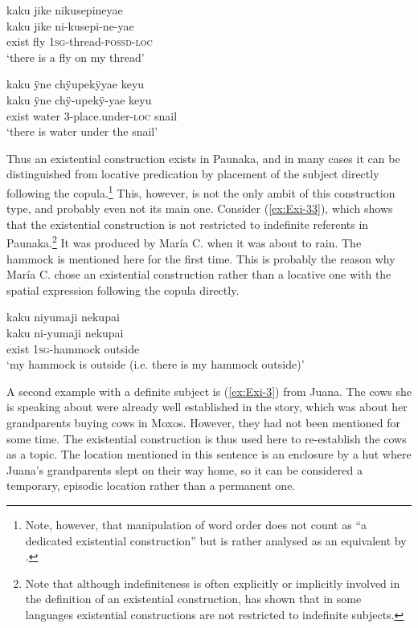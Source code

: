 \ea\label{ex:Exi-1}
\begingl
\glpreamble kaku jike nikusepineyae\\
\gla kaku jike ni-kusepi-ne-yae\\
\glb exist fly 1\textsc{sg}-thread-\textsc{possd}-\textsc{loc}\\
\glft ‘there is a fly on my thread’
\endgl
\trailingcitation{[rxx-e181024l.092]}
\xe

\ea\label{ex:Exi-2}
\begingl
\glpreamble kaku ÿne chÿupekÿyae keyu\\
\gla kaku ÿne chÿ-upekÿ-yae keyu\\
\glb exist water 3-place.under-\textsc{loc} snail\\
\glft ‘there is water under the snail’
\endgl
\trailingcitation{[jcx-e090727s.035]}
\xe


Thus an existential construction exists in Paunaka, and in many cases it can be distinguished from locative predication by placement of the subject directly following the copula.\footnote{Note, however, that manipulation of word order does not count as “a dedicated existential construction” but is rather analysed as an equivalent by \citet[19]{Creissels2014a}.} This, however, is not the only ambit of this construction type, and probably even not its main one. Consider (\ref{ex:Exi-33}), which shows that the existential construction is not restricted to indefinite referents in Paunaka.\footnote{Note that although indefiniteness is often explicitly or implicitly involved in the definition of an existential construction, \citet[4]{Creissels2014a} has shown that in some languages existential constructions are not restricted to indefinite subjects.} It was produced by María C. when it was about to rain. The hammock is mentioned here for the first time. This is probably the reason why María C. chose an existential construction rather than a locative one with the spatial expression following the copula directly.

\ea\label{ex:Exi-33}
\begingl
\glpreamble kaku niyumaji nekupai\\
\gla kaku ni-yumaji nekupai\\
\glb exist 1\textsc{sg}-hammock outside\\
\glft ‘my hammock is outside (i.e. there is my hammock outside)’
\endgl
\trailingcitation{[cux-120410ls.258]}
\xe

A second example with a definite subject is (\ref{ex:Exi-3}) from Juana. The cows she is speaking about were already well established in the story, which was about her grandparents buying cows in Moxos. However, they had not been mentioned for some time. The existential construction is thus used here to re-establish the cows as a topic. The location mentioned in this sentence is an enclosure by a hut where Juana’s grandparents slept on their way home, so it can be considered a temporary, episodic location rather than a permanent one.

